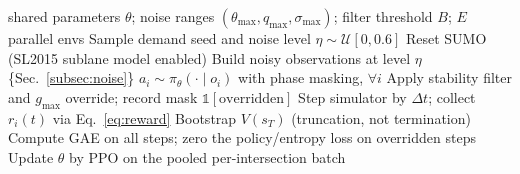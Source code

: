 \documentclass[journal]{IEEEtran}
\begin{document}
\begin{algorithm}[htbp]
\caption{HAPLight-RL training}
\label{alg:train}
\begin{algorithmic}[1]
\REQUIRE shared parameters $\theta$; noise ranges
         $(\theta_{\max},q_{\max},\sigma_{\max})$; filter threshold $B$;
         $E$ parallel envs
    \STATE Sample demand seed and noise level $\eta\sim\mathcal{U}[0,0.6]$
    \STATE Reset SUMO (SL2015 sublane model enabled)
      \STATE Build noisy observations at level $\eta$
             \{Sec.~\ref{subsec:noise}\}
      \STATE $a_i \sim \pi_\theta(\cdot \mid o_i)$ with phase masking,
             $\forall i$
      \STATE Apply stability filter and $g_{\max}$ override; record mask
             $\mathbb{1}[\text{overridden}]$
      \STATE Step simulator by $\Delta t$; collect $r_i(t)$ via
             Eq.~\eqref{eq:reward}
    \ENDFOR
    \STATE Bootstrap $V(s_T)$ (truncation, not termination)
  \ENDFOR
  \STATE Compute GAE on all steps; zero the policy/entropy loss on
         overridden steps
  \STATE Update $\theta$ by PPO on the pooled per-intersection batch
\ENDFOR
\end{algorithmic}
\end{algorithm}
\end{document}
